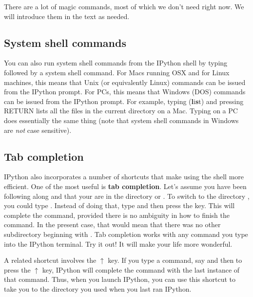 \documentclass[letterpaper,10pt,english]{sphinxmanual}
\begin{document}
There are a lot of magic commands, most of which we don't need right now.  We will introduce them in the text as needed.


\subsection{System shell commands}
\label{chap2/chap2_basics:system-shell-commands}\label{chap2/chap2_basics:syscommands}
You can also run system shell commands from the IPython shell by typing \code{!} followed by a system shell command.  For Macs running OSX and for Linux machines, this means that Unix (or equivalently Linux) commands can be issued from the IPython prompt.  For PCs, this means that Windows (DOS) commands can be issued from the IPython prompt.  For example, typing   (\textbf{l}i\textbf{s}t) and pressing RETURN lists all the files in the current directory on a Mac.  Typing  on a PC does essentially the same thing (note that system shell commands in Windows are \emph{not} case sensitive).


\subsection{Tab completion}
\label{chap2/chap2_basics:tab-completion}\label{chap2/chap2_basics:index-8}
IPython also incorporates a number of shortcuts that make using the shell more efficient.  One of the most useful is \textbf{tab completion}.  Let's assume you have been following along and that your are in the directory   or .  To switch to the directory , you could type .  Instead of doing that, type  and then press the  key.  This will complete the command, provided there is no ambiguity in how to finish the command.  In the present case, that would mean that there was no other subdirectory beginning with .  Tab completion works with any command you type into the IPython terminal.  Try it out!  It will make your life more wonderful.

A related shortcut involves the \(\uparrow\) key.  If you type a command, say  and then to press the \(\uparrow\) key, IPython will complete the  command with the last instance of that command.  Thus, when you launch IPython, you can use this shortcut to take you to the directory you used when you last ran IPython.
\end{document}

